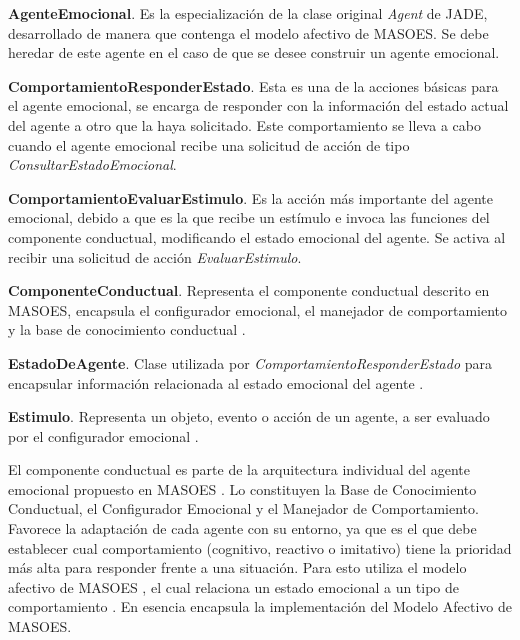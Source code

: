 \textbf{AgenteEmocional}. Es la especialización de
la clase original \textit{Agent} de JADE, desarrollado de manera que contenga
el modelo afectivo de MASOES.
Se debe heredar de este agente en el caso de que se desee construir un agente emocional.

\textbf{ComportamientoResponderEstado}. Esta es
una de la acciones básicas para el agente emocional, se encarga
de responder con la información del estado actual del agente a otro que
la haya solicitado. Este comportamiento se lleva a cabo cuando el
agente emocional recibe una solicitud de acción de tipo \textit{ConsultarEstadoEmocional}.

\textbf{ComportamientoEvaluarEstimulo}. Es la acción más
importante del agente emocional, debido a que es la que recibe un estímulo e
invoca las funciones del componente conductual, modificando el estado emocional
del agente. Se activa al recibir una solicitud de acción \textit{EvaluarEstimulo}.

\textbf{ComponenteConductual}. Representa el componente conductual
descrito en MASOES, encapsula el configurador emocional, el manejador de
comportamiento y la base de conocimiento conductual .

\textbf{EstadoDeAgente}. Clase utilizada por
\textit{ComportamientoResponderEstado} para encapsular información relacionada
al estado emocional del agente .

\textbf{Estimulo}. Representa un objeto, evento
o acción de un agente, a ser evaluado por el configurador emocional .


\label{componente-conductual}

El componente conductual es parte de la arquitectura individual del agente emocional propuesto en MASOES
.
Lo constituyen la Base de Conocimiento Conductual, el Configurador Emocional y
el Manejador de Comportamiento. Favorece la adaptación de cada agente con su
entorno, ya que es el que debe establecer cual comportamiento (cognitivo, reactivo o
imitativo) tiene la prioridad más alta para responder frente a una situación.
Para esto utiliza el modelo afectivo de MASOES
, el cual relaciona un estado emocional a un
tipo de comportamiento .
En esencia encapsula la implementación del Modelo Afectivo de MASOES.

